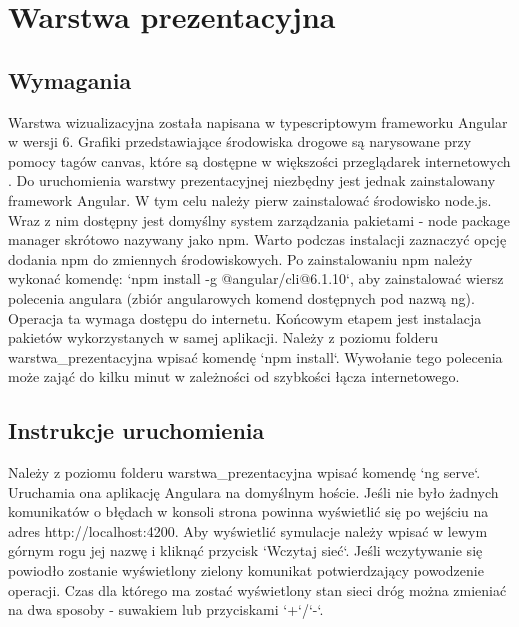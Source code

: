 \documentclass[12pt]{book}
\theoremstyle{plain}
\begin{document}
\section{Warstwa prezentacyjna}
\subsection{Wymagania}
Warstwa wizualizacyjna została napisana w typescriptowym frameworku Angular w wersji 6. Grafiki przedstawiające środowiska drogowe są narysowane przy pomocy tagów canvas, które są dostępne w większości przeglądarek internetowych \cite{canvas}. Do uruchomienia warstwy prezentacyjnej niezbędny jest jednak zainstalowany framework Angular. W tym celu należy pierw zainstalować środowisko node.js. Wraz z nim dostępny jest domyślny system zarządzania pakietami - node package manager skrótowo nazywany jako npm. Warto podczas instalacji zaznaczyć opcję dodania npm do zmiennych środowiskowych. Po zainstalowaniu npm należy wykonać komendę: `npm install -g @angular/cli@6.1.10`, aby zainstalować wiersz polecenia angulara (zbiór angularowych komend dostępnych pod nazwą ng). Operacja ta wymaga dostępu do internetu. Końcowym etapem jest instalacja pakietów wykorzystanych w samej aplikacji. Należy z poziomu folderu warstwa\_prezentacyjna wpisać komendę `npm install`. Wywołanie tego polecenia może zająć do kilku minut w zależności od szybkości łącza internetowego. 
\subsection{Instrukcje uruchomienia}
Należy z poziomu folderu warstwa\_prezentacyjna wpisać komendę `ng serve`. Uruchamia ona aplikację Angulara na domyślnym hoście. Jeśli nie było żadnych komunikatów o błędach w konsoli strona powinna wyświetlić się po wejściu na adres http://localhost:4200. Aby wyświetlić symulacje należy wpisać w lewym górnym rogu jej nazwę i kliknąć przycisk `Wczytaj sieć`. Jeśli wczytywanie się powiodło zostanie wyświetlony zielony komunikat potwierdzający powodzenie operacji. Czas dla którego ma zostać wyświetlony stan sieci dróg można zmieniać na dwa sposoby - suwakiem lub przyciskami `+`/`-`.




\end{document}
